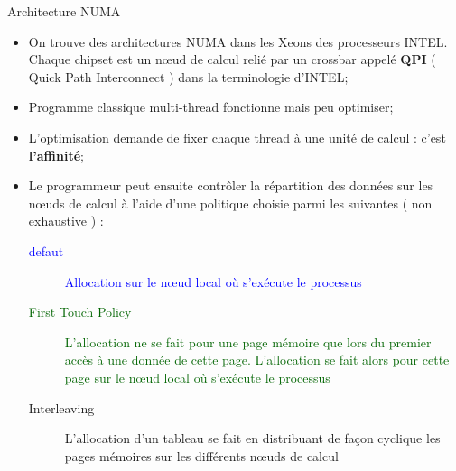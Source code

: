 \documentclass[handout]{beamer}
\begin{document}
\begin{frame}[fragile]{Architecture NUMA}
 
 \begin{itemize}
  \item On trouve des architectures NUMA dans les Xeons des processeurs INTEL. Chaque chipset est un n{\oe}ud de calcul
  relié par un crossbar appelé \textbf{QPI} ( Quick Path Interconnect ) dans la terminologie d'INTEL;
  \item Programme classique multi-thread fonctionne mais peu optimiser;
  \item L'optimisation demande de fixer chaque thread à une unité de calcul : c'est \textbf{l'affinité};
  \item Le programmeur peut ensuite contrôler la répartition des données sur les n{\oe}uds de calcul à
  l'aide d'une politique choisie parmi les suivantes ( non exhaustive ) :
  {\scriptsize
    \begin{description}
     \item[\textcolor{blue}{defaut}] \textcolor{blue}{Allocation sur le n{\oe}ud local où s'exécute le processus}
     \item[\textcolor{DarkGreen}{First Touch Policy}] \textcolor{DarkGreen}{L'allocation ne se fait pour une page mémoire que lors du premier
     accès à une donnée de cette page. L'allocation se fait alors  pour cette page sur le n{\oe}ud local où s'exécute le processus}
     \item[\textcolor{BrickRed}{Interleaving}] \textcolor{BrickRed}{L'allocation d'un tableau se fait en distribuant de façon cyclique les pages
     mémoires sur les différents n{\oe}uds de calcul}
    \end{description}
}
 \end{itemize}
\end{frame}
\end{document}
